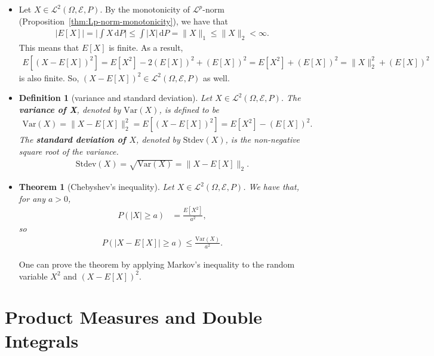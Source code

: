 \documentclass[10pt]{article}
\newtheorem{theorem}[lemma]{Theorem}
\newtheorem{definition}[lemma]{Definition}
\numberwithin{lemma}{section}
\newcommand{\dee}{\mathrm{d}}
\newcommand{\Var}{\mathrm{Var}}
\newcommand{\Stdev}{\mathrm{Stdev}}
\newcommand{\mcal}[1]{\mathcal{#1}}
\begin{document}
\begin{itemize}
  \item Let $X \in \mcal{L}^2(\Omega, \mcal{E}, P)$. By the monotonicity of $\mcal{L}^p$-norm (Proposition~\ref{thm:Lp-norm-monotonicity}), we have that
  \begin{align*}
    \bigg| E[X] \bigg| = \bigg| \int X\,\dee P \bigg| \leq \int |X|\, \dee P = \| X \|_1 \leq \| X \|_2 < \infty.
  \end{align*}
  This means that $E[X]$ is finite. As a result,
  \begin{align*}
    E[(X - E[X])^2] = E[X^2] - 2(E[X])^2 + (E[X])^2 = E[X^2] + (E[X])^2 = \| X \|_2^2 + (E[X])^2
  \end{align*}
  is also finite. So, $(X - E[X])^2 \in \mcal{L}^2(\Omega, \mcal{E}, P)$ as well.

  \item \begin{definition}[variance and standard deviation] 
    Let $X \in \mcal{L}^2(\Omega, \mcal{E}, P)$. The {\bf variance of X}, denoted by $\Var(X)$, is defined to be
    \begin{align*}
      \Var(X) = \| X - E[X] \|_2^2 =  E[(X - E[X])^2] = E[X^2] - (E[X])^2.
    \end{align*}
    The {\bf standard deviation of $X$}, denoted by $\Stdev(X)$, is the non-negative square root of the variance.
    \begin{align*}
      \Stdev(X) = \sqrt{\Var(X)} = \| X - E[X] \|_2.
    \end{align*}
  \end{definition}

  \item \begin{theorem}[Chebyshev's inequality]
    Let $X \in \mcal{L}^2(\Omega, \mcal{E}, P)$. We have that, for any $a > 0$,
    \begin{align*}
      P(|X| \geq a) &= \frac{E[X^2]}{a^2},
    \end{align*}
    so
    \begin{align*}
      P(| X - E[X] | \geq a) \leq \frac{\Var(X)}{a^2}.
    \end{align*}
  \end{theorem}
  One can prove the theorem by applying Markov's inequality to the random variable $X^2$ and $(X - E[X])^2$.
\end{itemize}

\section{Product Measures and Double Integrals}
\end{document}
